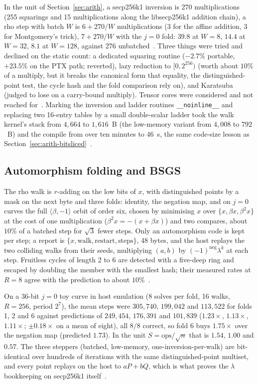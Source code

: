 In the unit of Section~\ref{sec:arith}, a secp256k1 inversion is 270
multiplications (255 squarings and 15 multiplications along the
libsecp256k1 addition chain), a rho step with batch $W$ is $6+270/W$
multiplications ($3$ for the affine addition, $3$ for Montgomery's
trick), $7+270/W$ with the $j=0$ fold: $39.8$ at $W=8$, $14.4$ at
$W=32$, $8.1$ at $W=128$, against 276 unbatched~.
Three things were tried and declined on the static count: a
dedicated squaring routine ($-2.7\%$ portable, $+23.5\%$ on the PTX
path; reverted), lazy reduction to $[0,2^{256})$ (worth about $10\%$
of a multiply, but it breaks the canonical form that equality, the
distinguished-point test, the cycle hash and the fold comparison rely
on), and Karatsuba (judged to lose on a carry-bound multiply). Tensor
cores were considered and not reached for~.
Marking the inversion and ladder routines \texttt{\_\_noinline\_\_}
and replacing two 16-entry tables by a small double-scalar ladder
took the walk kernel's stack from $4{,}664$ to $1{,}616$~B (the
low-memory variant from $4{,}008$ to $792$~B) and the compile from
over ten minutes to 46~s, the same code-size lesson as
Section~\ref{sec:arith-bitsliced}~.

\subsection{Automorphism folding and BSGS}
\label{sec:othergpu-rho}

The rho walk is $r$-adding on the low bits of $x$, with distinguished
points by a mask on the next byte and three folds: identity, the
negation map, and on $j=0$ curves the full $\langle\beta,-1\rangle$
orbit of order six, chosen by minimising $x$ over
$\{x,\beta x,\beta^2 x\}$ at the cost of one multiplication
($\beta^2x=-(x+\beta x)$) and two compares, about $10\%$ of a batched
step for $\sqrt3$ fewer steps. Only an automorphism code is kept per
step; a report is $\{x,\text{walk},\text{restart},\text{steps}\}$, 48
bytes, and the host replays the two colliding walks from their seeds,
multiplying $(a,b)$ by $(-1)^{\text{neg}}\lambda^k$ at each step. Fruitless
cycles of length 2 to 6 are detected with a five-deep ring and escaped
by doubling the member with the smallest hash; their measured rates
at $R=8$ agree with the prediction to about
$10\%$~.

On a 36-bit $j=0$ toy curve in host emulation (8 solves per fold, 16
walks, $R=256$, period $2^7$), the mean steps were $305{,}740$,
$199{,}042$ and $113{,}522$ for folds 1, 2 and 6 against predictions of
$249{,}454$, $176{,}391$ and $101{,}839$ ($1.23\times$, $1.13\times$,
$1.11\times$; $\pm0.18\times$ on a mean of eight), all $8/8$ correct,
so fold 6 buys $1.75\times$ over the negation map (predicted $1.73$).
In the unit $S=\text{ops}/\sqrt n$ that is $1.54$, $1.00$ and $0.57$.
The three steppers (batched, low-memory, one-inversion-per-walk) are
bit-identical over hundreds of iterations with the same
distinguished-point multiset, and every point replays on the host to
$aP+bQ$, which is what proves the $\lambda$ bookkeeping on secp256k1
itself~.

